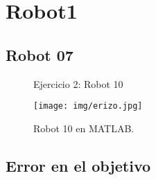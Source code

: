 \section{\textbf{Robot1}}
\subsection{\textbf{Robot 07}}

\begin{figure}[H]
	\centering
	\hfill
	\caption{Ejercicio 2: Robot 10}
	\label{fig:Robot10}
\end{figure}
\begin{figure}[H]
	\centering
	\texttt{[image: img/erizo.jpg]}
	\caption{Robot 10 en MATLAB.}
	\label{fig:Robot10matlab}
\end{figure}
\subsection{\textbf{Error en el objetivo}}